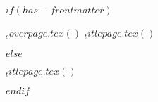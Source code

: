 $if(has-frontmatter)$
\begin{frontmatter}
\begin{titlepage}
$_coverpage.tex()$%
$_titlepage.tex()$
  
\end{titlepage}
\setcounter{page}{1}
\end{frontmatter}
$else$
\begin{titlepage}
$_titlepage.tex()$
  
\end{titlepage}
$endif$